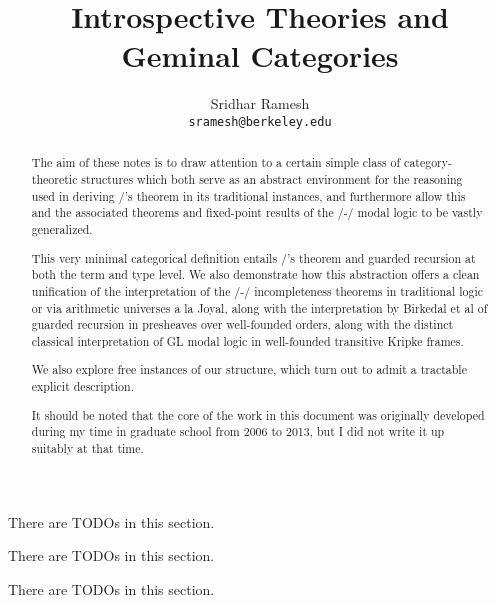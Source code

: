 \documentclass[12pt]{article}
\title{Introspective Theories and Geminal Categories}
\author{
  Sridhar Ramesh\\
  \texttt{sramesh@berkeley.edu}
}
\begin{document}
\maketitle

\begin{abstract}

The aim of these notes is to draw attention to a certain simple class of category-theoretic structures which both serve as an abstract environment for the reasoning used in deriving \Loeb/'s theorem in its traditional instances, and furthermore allow this and the associated theorems and fixed-point results of the \Goedel/-\Loeb/ modal logic to be vastly generalized.

This very minimal categorical definition entails \Loeb/'s theorem and guarded recursion at both the term and type level. We also demonstrate how this abstraction offers a clean unification of the interpretation of the \Godel/-\Lob/ incompleteness theorems in traditional logic or via arithmetic universes a la Joyal, along with the interpretation by Birkedal et al of guarded recursion in presheaves over well-founded orders, along with the distinct classical interpretation of GL modal logic in well-founded transitive Kripke frames.

We also explore free instances of our structure, which turn out to admit a tractable explicit description.

It should be noted that the core of the work in this document was originally developed during my time in graduate school from 2006 to 2013, but I did not write it up suitably at that time.
\end{abstract}

\newpage
\tableofcontents

\newpage
\setcounter{section}{-1}
\setcounter{page}{1}


There are \theTODOcounter\; TODOs in this section.
\setcounter{TODOcounter}{0}


There are \theTODOcounter\; TODOs in this section.
\setcounter{TODOcounter}{0}


There are \theTODOcounter\; TODOs in this section.
\setcounter{TODOcounter}{0}
\end{document}
